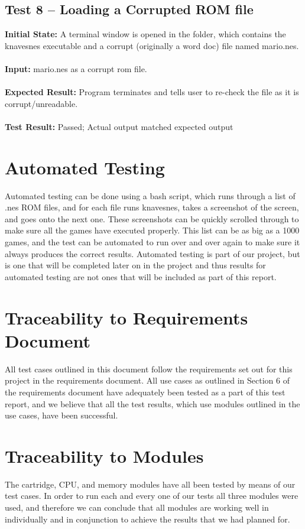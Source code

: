 \documentclass[12pt]{article}
\begin{document}
	\subsection{Test 8 – Loading a Corrupted ROM file}
		\textbf{Initial State: } A terminal window is opened in the folder, which contains the knavesnes executable and a corrupt (originally a word doc) file named mario.nes.\\\\
		\textbf{Input: } mario.nes as a corrupt rom file.\\\\
		\textbf{Expected Result: } Program terminates and tells user to re-check the file as it is corrupt/unreadable.\\\\
		\textbf{Test Result: } Passed; Actual output matched expected output


\section{Automated Testing}
	Automated testing can be done using a bash script, which runs through a list of .nes ROM files, and for each file runs knavesnes, takes a screenshot of the screen, and goes onto the next one. These screenshots can be quickly scrolled through to make sure all the games have executed properly. This list can be as big as a 1000 games, and the test can be automated to run over and over again to make sure it always produces the correct results. Automated testing is part of our project, but is one that will be completed later on in the project and thus results for automated testing are not ones that will be included as part of this report.

\section{Traceability to Requirements Document}
	All test cases outlined in this document follow the requirements set out for this project in the requirements document. All use cases as outlined in Section 6 of the requirements document have adequately been tested as a part of this test report, and we believe that all the test results, which use modules outlined in the use cases, have been successful. 

\section{Traceability to Modules}
	The cartridge, CPU, and memory modules have all been tested by means of our test cases. In order to run each and every one of our tests all three modules were used, and therefore we can conclude that all modules are working well in individually and in conjunction to achieve the results that we had planned for. 
\end{document}
